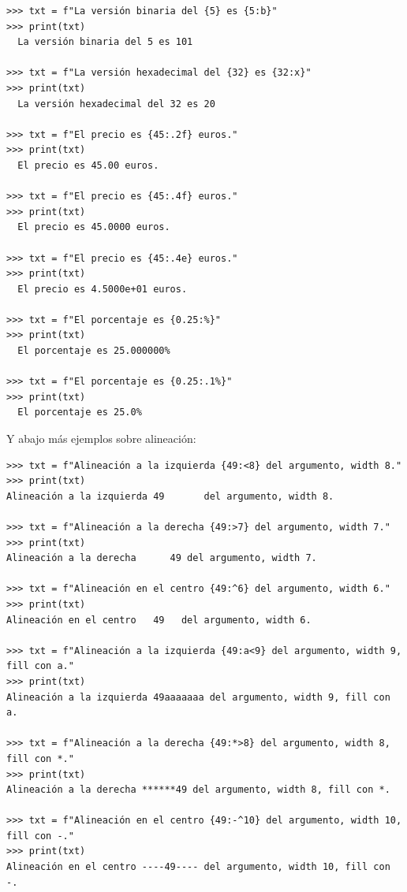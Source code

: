 \begin{small}
\begin{Verbatim}[frame=single]
>>> txt = f"La versión binaria del {5} es {5:b}"
>>> print(txt)
  La versión binaria del 5 es 101

>>> txt = f"La versión hexadecimal del {32} es {32:x}"
>>> print(txt)
  La versión hexadecimal del 32 es 20
  
>>> txt = f"El precio es {45:.2f} euros."
>>> print(txt)
  El precio es 45.00 euros.

>>> txt = f"El precio es {45:.4f} euros."
>>> print(txt)
  El precio es 45.0000 euros.

>>> txt = f"El precio es {45:.4e} euros."
>>> print(txt)
  El precio es 4.5000e+01 euros.

>>> txt = f"El porcentaje es {0.25:%}"
>>> print(txt)
  El porcentaje es 25.000000%

>>> txt = f"El porcentaje es {0.25:.1%}"
>>> print(txt)
  El porcentaje es 25.0%
\end{Verbatim}
\end{small}

Y abajo más ejemplos sobre alineación:

\begin{small}
\begin{Verbatim}[frame=single]
>>> txt = f"Alineación a la izquierda {49:<8} del argumento, width 8."
>>> print(txt)
Alineación a la izquierda 49       del argumento, width 8.

>>> txt = f"Alineación a la derecha {49:>7} del argumento, width 7."
>>> print(txt)
Alineación a la derecha      49 del argumento, width 7.

>>> txt = f"Alineación en el centro {49:^6} del argumento, width 6."
>>> print(txt)
Alineación en el centro   49   del argumento, width 6.

>>> txt = f"Alineación a la izquierda {49:a<9} del argumento, width 9, fill con a."
>>> print(txt)
Alineación a la izquierda 49aaaaaaa del argumento, width 9, fill con a.

>>> txt = f"Alineación a la derecha {49:*>8} del argumento, width 8, fill con *."
>>> print(txt)
Alineación a la derecha ******49 del argumento, width 8, fill con *.

>>> txt = f"Alineación en el centro {49:-^10} del argumento, width 10, fill con -."
>>> print(txt)
Alineación en el centro ----49---- del argumento, width 10, fill con -.
\end{Verbatim}
\end{small}



